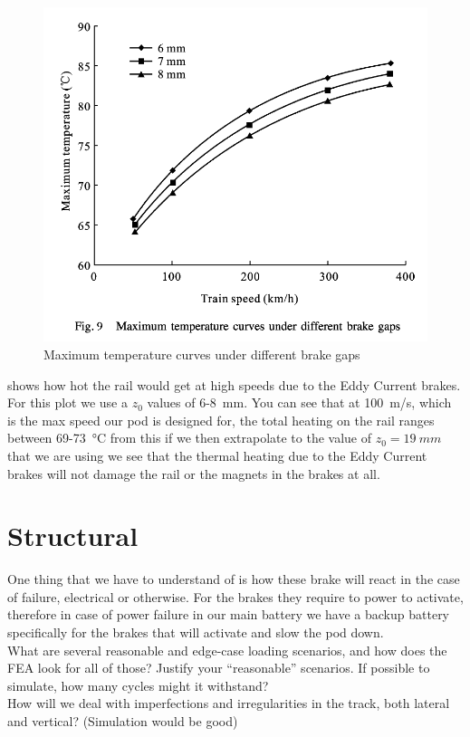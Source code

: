 \documentclass[main.tex]{subfiles}
\begin{document}
    \begin{figure}
    	\centering
        \includegraphics[width=\linewidth]{images/EC_heat}
        \caption{Maximum temperature curves under different brake gaps}
        \label{fig:ec-heat}
    \end{figure}
     shows how hot the rail would get at high speeds due to the Eddy Current brakes. For this plot we use a $z_0$ values of 6-\SI{8}{mm}. You can see that at \SI{100}{m/s}, which is the max speed our pod is designed for, the total heating on the rail ranges between 69-\SI{73}{\celsius} from this if we then extrapolate to the value of $z_0 = \SI{19}{mm}$ that we are using we see that the thermal heating due to the Eddy Current brakes will not damage the rail or the magnets in the brakes at all.

    \section{Structural}
    One thing that we have to understand of is how these brake will react in the case of failure, electrical or otherwise. For the brakes they require to power to activate, therefore in case of power failure in our main battery we have a backup battery specifically for the brakes that will activate and slow the pod down.  \\
    What are several reasonable and edge-case loading scenarios, and how does the FEA look for all of those? Justify your “reasonable” scenarios. If possible to simulate, how many cycles might it withstand?\\
    How will we deal with imperfections and irregularities in the track, both lateral and vertical? (Simulation would be good)
\end{document}

